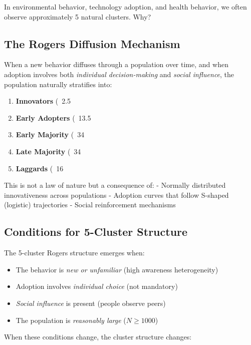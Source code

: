In environmental behavior, technology adoption, and health behavior, we often
observe approximately 5 natural clusters. Why?

\subsection{The Rogers Diffusion Mechanism}

When a new behavior diffuses through a population over time, and when adoption
involves both \textit{individual decision-making} and \textit{social influence},
the population naturally stratifies into:

\begin{enumerate}
\item \textbf{Innovators} (~2.5%
\item \textbf{Early Adopters} (~13.5%
\item \textbf{Early Majority} (~34%
\item \textbf{Late Majority} (~34%
\item \textbf{Laggards} (~16%
\end{enumerate}

This is not a law of nature but a consequence of:
- Normally distributed innovativeness across populations
- Adoption curves that follow S-shaped (logistic) trajectories
- Social reinforcement mechanisms

\subsection{Conditions for 5-Cluster Structure}

The 5-cluster Rogers structure emerges when:
\begin{itemize}[nosep]
\item The behavior is \textit{new or unfamiliar} (high awareness heterogeneity)
\item Adoption involves \textit{individual choice} (not mandatory)
\item \textit{Social influence} is present (people observe peers)
\item The population is \textit{reasonably large} ($N \geq 1000$)
\end{itemize}

When these conditions change, the cluster structure changes:

